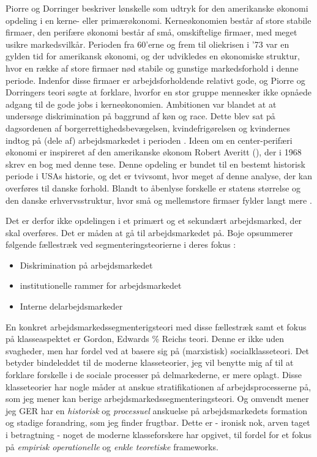 Piorre og Dorringer beskriver lønskelle som udtryk for den amerikanske økonomi opdeling i en kerne- eller primærøkonomi. Kerneøkonomien består af store stabile firmaer, den perifære økonomi består af små, omskiftelige firmaer, med meget usikre markedsvilkår. %
Perioden fra 60'erne og frem til oliekrisen i '73 var en gylden tid for amerikansk økonomi, og der udvikledes en økonomiske struktur, hvor en række af store firmaer nød stabile og gunstige markedsforhold i denne periode. %
Indenfor disse firmaer er arbejdsforholdende relativt gode, og Piorre og Dorringers teori søgte at forklare, hvorfor en stor gruppe mennesker ikke opnåede adgang til de gode jobs i kerneøkonomien. Ambitionen var blandet at at undersøge diskrimination på baggrund af køn og race. Dette blev sat på dagsordenen af borgerrettighedsbevægelsen, kvindefrigørelsen og kvindernes indtog på (dele af) arbejdsmarkedet i perioden \parencites[1216]{Cain1976}. Ideen om en center-perifæri økonomi er inspireret af den amerikanske økonom Robert Averitt (\citeyear{Averitt1968}), der i 1968 skrev en bog med denne tese. Denne opdeling er bundet til en bestemt historisk periode i USAs historie, og det er tvivsomt, hvor meget af denne analyse, der kan overføres til danske forhold. Blandt to åbenlyse forskelle er statens størrelse og den danske erhvervsstruktur, hvor små og mellemstore firmaer fylder langt mere \parencite[36,120]{Boje1985}.  %

Det er derfor ikke opdelingen i et primært og et sekundært arbejdsmarked, der skal overføres. Det er måden at gå til arbejdsmarkedet på. Boje opsummerer følgende fællestræk ved segmenteringsteorierne i deres fokus \parencite[106]{BojeToft1989}:  
%
\begin{itemize}
\itemsep-0.7em  
  	\item Diskrimination på arbejdsmarkedet
  	\item institutionelle rammer for arbejdsmarkedet
	\item Interne delarbejdsmarkeder
\end{itemize}
%

En konkret arbejdsmarkedssegmenterigsteori med disse fællestræk samt et fokus på klasseaspektet er Gordon, Edwards \% Reichs teori. Denne er ikke uden svagheder, men har fordel ved at basere sig på (marxistisk) socialklasseteori. Det betyder bindeleddet til de moderne klasseteorier, jeg vil benytte mig af til at forklare forskelle i de sociale processer på delmarkederne, er mere oplagt. Disse klasseteorier har nogle måder at anskue stratifikationen af arbejdsprocesserne på, som jeg mener kan berige arbejdsmarkedssegmenteringsteori. Og omvendt mener jeg GER har en \emph{historisk} og \emph{processuel} anskuelse på arbejdsmarkedets formation og stadige forandring, som jeg finder frugtbar. Dette er - ironisk nok, arven taget i betragtning - noget de moderne klasseforskere har opgivet, til fordel for et fokus på \emph{empirisk operationelle} og \emph{enkle teoretiske} frameworks.



